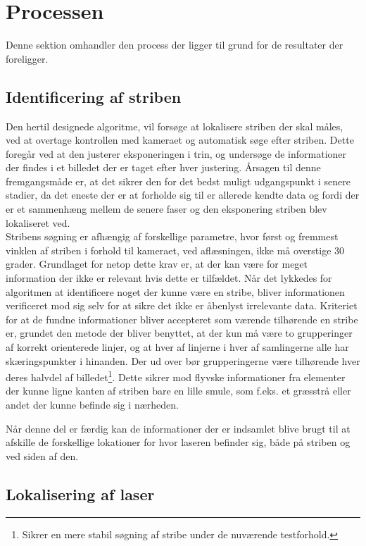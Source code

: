 \section{Processen}

Denne sektion omhandler den process der ligger til grund for de resultater der foreligger.

\subsection{Identificering af striben}

Den hertil designede algoritme, vil forsøge at lokalisere striben der skal måles, ved at overtage kontrollen med kameraet og automatisk søge efter striben.
Dette foregår ved at den justerer eksponeringen i trin, og undersøge de informationer der findes i et billedet der er taget efter hver justering.
Årsagen til denne fremgangsmåde er, at det sikrer den for det bedst muligt udgangspunkt i senere stadier, da det eneste der er at forholde sig til er allerede kendte data og fordi der er et sammenhæng mellem de senere faser og den eksponering striben blev lokaliseret ved.
\\
Stribens søgning er afhængig af forskellige parametre, hvor først og fremmest vinklen af striben i forhold til kameraet, ved aflæsningen, ikke må overstige 30 grader. Grundlaget for netop dette krav er, at der kan være for meget information der ikke er relevant hvis dette er tilfældet.
Når det lykkedes for algoritmen at identificere noget der kunne være en stribe, bliver informationen verificeret mod sig selv for at sikre det ikke er åbenlyst irrelevante data. Kriteriet for at de fundne informationer bliver accepteret som værende tilhørende en stribe er, grundet den metode der bliver benyttet, at der kun må være to grupperinger af korrekt orienterede linjer, og at hver af linjerne i hver af samlingerne alle har skæringspunkter i hinanden.
Der ud over bør grupperingerne være tilhørende hver deres halvdel af billedet\footnote{Sikrer en mere stabil søgning af stribe under de nuværende testforhold.}.
Dette sikrer mod flyvske informationer fra elementer der kunne ligne kanten af striben bare en lille smule, som f.eks. et græsstrå eller andet der kunne befinde sig i nærheden.

Når denne del er færdig kan de informationer der er indsamlet blive brugt til at afskille de forskellige lokationer for hvor laseren befinder sig, både på striben og ved siden af den.

\subsection{Lokalisering af laser}

